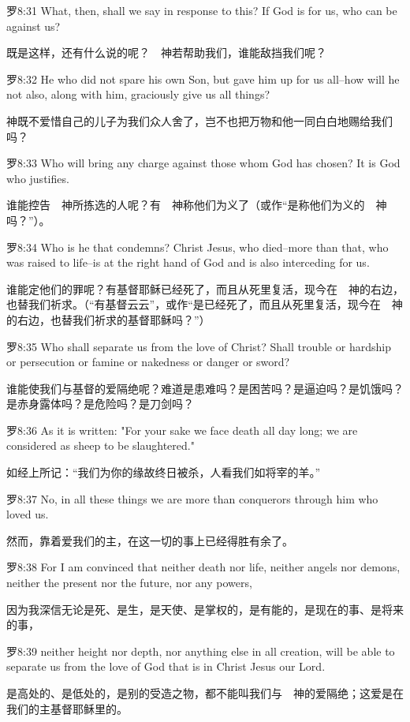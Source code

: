 \documentclass[a4paper,11pt,onecolumn,twoside]{ctexart}
\begin{document}
\begin{multicols}{2}
 罗8:31
 What, then, shall we say in response to this? If God is for us, who can be against us?

 既是这样，还有什么说的呢？　神若帮助我们，谁能敌挡我们呢？


 罗8:32
 He who did not spare his own Son, but gave him up for us all--how will he not also, along with him, graciously give us all things?

 神既不爱惜自己的儿子为我们众人舍了，岂不也把万物和他一同白白地赐给我们吗？


 罗8:33
 Who will bring any charge against those whom God has chosen? It is God who justifies.

 谁能控告　神所拣选的人呢？有　神称他们为义了（或作“是称他们为义的　神吗？”）。


 罗8:34
 Who is he that condemns? Christ Jesus, who died--more than that, who was raised to life--is at the right hand of God and is also interceding for us.

 谁能定他们的罪呢？有基督耶稣已经死了，而且从死里复活，现今在　神的右边，也替我们祈求。（“有基督云云”，或作“是已经死了，而且从死里复活，现今在　神的右边，也替我们祈求的基督耶稣吗？”）


 罗8:35
 Who shall separate us from the love of Christ? Shall trouble or hardship or persecution or famine or nakedness or danger or sword?

 谁能使我们与基督的爱隔绝呢？难道是患难吗？是困苦吗？是逼迫吗？是饥饿吗？是赤身露体吗？是危险吗？是刀剑吗？


 罗8:36
 As it is written: "For your sake we face death all day long; we are considered as sheep to be slaughtered."

 如经上所记：“我们为你的缘故终日被杀，人看我们如将宰的羊。”


 罗8:37
 No, in all these things we are more than conquerors through him who loved us.

 然而，靠着爱我们的主，在这一切的事上已经得胜有余了。


 罗8:38
 For I am convinced that neither death nor life, neither angels nor demons, neither the present nor the future, nor any powers,

 因为我深信无论是死、是生，是天使、是掌权的，是有能的，是现在的事、是将来的事，


 罗8:39
 neither height nor depth, nor anything else in all creation, will be able to separate us from the love of God that is in Christ Jesus our Lord.

 是高处的、是低处的，是别的受造之物，都不能叫我们与　神的爱隔绝；这爱是在我们的主基督耶稣里的。



\end{multicols}
\end{document}
